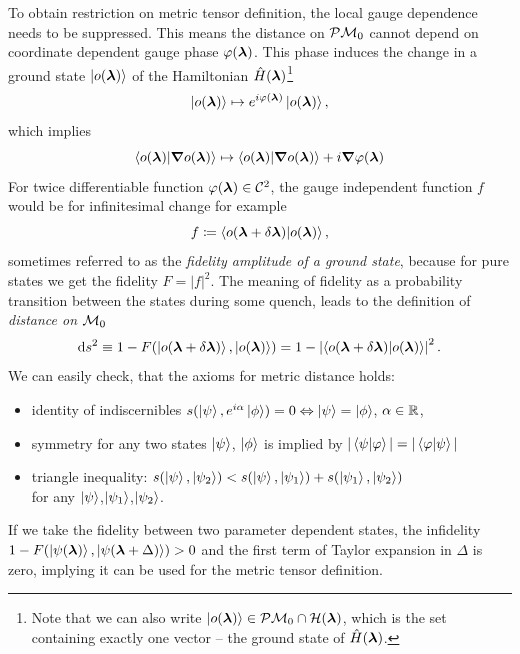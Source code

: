 To obtain restriction on metric tensor definition, the local gauge dependence needs to be suppressed. This means the distance on $\mathcal{P}\mathcal{M}_0$ cannot depend on coordinate dependent gauge phase $\varphi({\bm\lambda})$. This phase induces the change in a ground state $\ket{o({\bm\lambda})}$ of the Hamiltonian $\hat{H}({\bm\lambda})$\footnote{Note that we can also write $\ket{o({\bm\lambda})}\in \mathcal{P}\mathcal{M}_0\cap \mathcal{H}({\bm\lambda})$, which is the set containing exactly one vector -- the ground state of $\hat{H}({\bm\lambda})$.}
\begin{equation}
    \ket{o({\bm\lambda})}\mapsto e^{i\varphi({\bm\lambda})} \ket{o({\bm\lambda})},
\end{equation}
which implies
\begin{equation}
        \braket{o({\bm\lambda})|\bm \nabla o({\bm\lambda})}\mapsto \braket{o({\bm\lambda})|\bm \nabla o({\bm\lambda})} + i\bm \nabla \varphi({\bm\lambda}) 
\end{equation} 
For twice differentiable function $\varphi({\bm\lambda})\in \mathcal C^2$, the gauge independent function $f$ would be for infinitesimal change for example
\begin{equation}
    f\coloneqq \braket{o(\bm{{\bm\lambda}}+\delta\bm{{\bm\lambda}})|o(\bm{{\bm\lambda}})},
    \label{eq:fidelityDefinition}
\end{equation}
sometimes referred to as the \emph{fidelity amplitude of a ground state}, because for pure states we get the fidelity $F=|f|^2$. The meaning of fidelity as a probability transition between the states during some quench, leads to the definition of \emph{distance on $\mathcal{M}_0$}
\begin{equation}
    \mathrm{d} s^2 \equiv 1-F(\ket{o(\bm{{\bm\lambda}}+\delta\bm{{\bm\lambda}})},\ket{o({\bm\lambda})})= 1-\left|\braket{o(\bm{{\bm\lambda}}+\delta\bm{{\bm\lambda}})|o(\bm{{\bm\lambda}})}\right|^2.
    \label{eq:distanceOnM0}
\end{equation}
We can easily check, that the axioms for metric distance holds:
\begin{itemize}
    \item identity of indiscernibles $s(\ket{\psi},e^{i\alpha}\ket{\phi}) = 0 \Leftrightarrow \ket{\psi}=\ket{\phi}$, $\alpha\in\mathbb{R}$,
    \item symmetry for any two states $\ket{\psi}$, $\ket{\phi}$ is implied by $|\braket{\psi|\varphi}|=|\braket{\varphi|\psi}|$
    \item triangle inequality: $s(\ket{\psi},\ket{\psi_2}) <s(\ket{\psi},\ket{\psi_1}) + s(\ket{\psi_1},\ket{\psi_2})$\\
    for any $\ket{\psi}$,$\ket{\psi_1}$,$\ket{\psi_2}$.
\end{itemize}
If we take the fidelity between two parameter dependent states, the infidelity $1-F(\ket{\psi({\bm\lambda})},\ket{\psi({\bm\lambda}+\Delta)})>0$ and the first term of Taylor expansion in $\Delta$ is zero, implying it can be used for the metric tensor definition.


